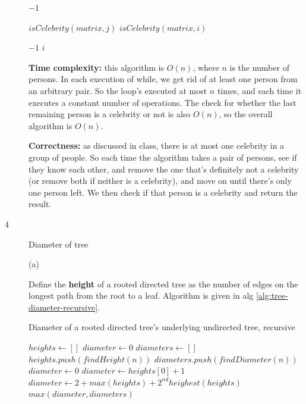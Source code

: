 \documentclass{article}
\begin{document}
\begin{description}
\begin{algorithm}[h]
\begin{algorithmic}[1]
        \State \Return $-1$
      \EndIf

        \State \Return $isCelebrity(matrix, j)$
      \Else
        \State \Return $isCelebrity(matrix, i)$
      \EndIf
    \EndFunction

          \State \Return $-1$
        \EndIf
      \EndFor
      \State \Return $i$
    \EndFunction
    \end{algorithmic}
  \end{algorithm}

  \textbf{Time complexity:} this algorithm is $O(n)$, where $n$ is the number of persons. In each execution of while, we get rid of at least one person from an arbitrary pair. So the loop's executed at most $n$ times, and each time it executes a constant number of operations. The check for whether the last remaining person is a celebrity or not is also $O(n)$, so the overall algorithm is $O(n)$.

  \textbf{Correctness:} as discussed in class, there is at most one celebrity in a group of people. So each time the algorithm takes a pair of persons, see if they know each other, and remove the one that's definitely not a celebrity (or remove both if neither is a celebrity), and move on until there's only one person left. We then check if that person is a celebrity and return the result.

\item[4]{Diameter of tree}
  
  (a)

  Define the \textbf{height} of a rooted directed tree as the number of edges on the longest path from the root to a leaf. Algorithm is given in alg \ref{alg:tree-diameter-recursive}.

  \begin{algorithm}[h]
  \caption{Diameter of a rooted directed tree's underlying undirected tree, recursive}
  \label{alg:tree-diameter-recursive}
    \begin{algorithmic}[1]
      \State $heights \gets []$
      \State $diameter \gets 0$
      \State $diameters \gets []$
        \State $heights.push(findHeight(n))$
        \State $diameters.push(findDiameter(n))$
      \EndFor
        \State $diameter \gets 0$
        \State $diameter \gets heights[0] + 1$
      \Else
        \State $diameter \gets 2 + max(heights) + 2^{nd}heighest(heights)$
      \EndIf
      \State \Return $max(diameter, diameters)$
    \EndFunction


\end{algorithmic}
\end{algorithm}
\end{description}
\end{document}
